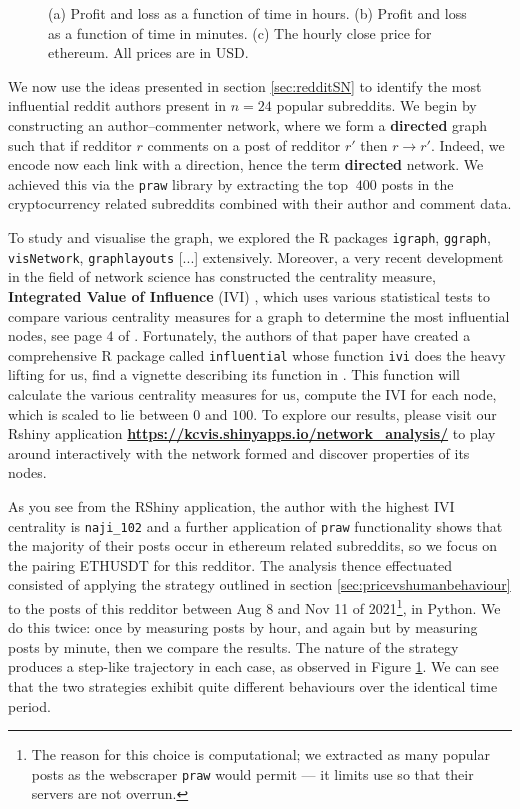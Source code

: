 \documentclass[twoside]{report}
\newcommand{\code}{\texttt}
\begin{document}
\begin{spacing}{1}
\begin{figure}[h]
\caption{(a) Profit and loss as a function of time in hours. (b) Profit and loss as a function of time in minutes. (c) The hourly close price for ethereum. All prices are in USD.}
\label{fig:pnl_naji102}
\end{figure}
We now use the ideas presented in section \ref{sec:redditSN} to identify the most influential reddit authors present in $n=24$ popular subreddits. We begin by constructing an author--commenter network, where we form a \textbf{directed} graph such that if redditor $r$ comments on a post of redditor $r'$ then $r \rightarrow r'$. Indeed, we encode now each link with a direction, hence the term \textbf{directed} network. We achieved this via the \code{praw} library by extracting the top $~400$ posts in the cryptocurrency related subreddits combined with their author and comment data. 



To study and visualise the graph, we explored the R packages \code{igraph}, \code{ggraph}, \code{visNetwork}, \code{graphlayouts} [...] extensively. Moreover, a very recent development in the field of network science has constructed the centrality measure, \textbf{Integrated Value of Influence} (IVI) \cite{IVIpatterns}, which uses various statistical tests to compare various centrality measures for a graph to determine the most influential nodes, see page $4$ of \cite{IVIpatterns}. Fortunately, the authors of that paper have created a comprehensive R package called \code{influential} whose function \code{ivi} does the heavy lifting for us, find a vignette describing its function in \cite{IVIvignette}. This function will calculate the various centrality measures for us, compute the IVI for each node, which is scaled to lie between $0$ and $100$. To explore our results, please visit our Rshiny application \textbf{\url{https://kcvis.shinyapps.io/network_analysis/}} to play around interactively with the network formed and discover properties of its nodes. 



As you see from the RShiny application, the author with the highest IVI centrality is \code{naji\_102} and a further application of \code{praw} functionality shows that the majority of their posts occur in ethereum related subreddits, so we focus on the pairing ETHUSDT for this redditor. The analysis thence effectuated consisted of applying the strategy outlined in section \ref{sec:pricevshumanbehaviour} to the posts of this redditor between Aug 8 and Nov 11 of 2021\footnote{The reason for this choice is computational; we extracted as many popular posts as the webscraper \code{praw} would permit --- it limits use so that their servers are not overrun.}, in Python. We do this twice: once by measuring posts by hour, and again but by measuring posts by minute, then we compare the results. The nature of the strategy produces a step-like trajectory in each case, as observed in Figure \ref{fig:pnl_naji102}. We can see that the two strategies exhibit quite different behaviours over the identical time period.





\end{spacing}
\end{document}
